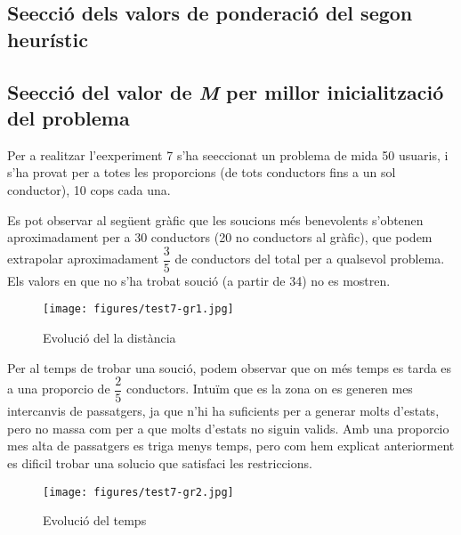 \subsection{Se\lgem ecció dels valors de ponderació del segon heurístic}

\subsection{Se\lgem ecció del valor de \emph{M} per millor inicialització del problema}
Per a realitzar l'eexperiment 7 s'ha se\lgem eccionat un problema de mida 50 usuaris, i s'ha provat per a totes les proporcions
(de tots conductors fins a un sol conductor), 10 cops cada una.

Es pot observar al següent gràfic que les so\lgem ucions més benevolents s'obtenen aproximadament per a 30 conductors (20 no conductors al gràfic),
que podem extrapolar aproximadament $\dfrac{3}{5}$ de conductors del total per a qualsevol problema.
Els valors en que no s'ha trobat so\lgem ució (a partir de 34) no es mostren.

\begin{figure}[H]
\begin{center}
 \texttt{[image: figures/test7-gr1.jpg]}
 \label{test7-gr2}
\end{center}
\caption{Evolució del la distància}
\end{figure}

Per al temps de trobar una so\lgem ució, podem observar que on més temps es tarda es a una proporcio de $\dfrac{2}{5}$ conductors.
Intuïm que es la zona on es generen mes intercanvis de passatgers, ja que n'hi ha suficients per a generar molts d'estats,
pero no massa com per a que molts d'estats no siguin valids.
Amb una proporcio mes alta de passatgers es triga menys temps, pero com hem explicat anteriorment es dificil trobar una solucio que satisfaci les restriccions.

\begin{figure}[H]
\begin{center}
 \texttt{[image: figures/test7-gr2.jpg]}
 \label{test7-gr2}
\end{center}
\caption{Evolució del temps}
\end{figure}
        
